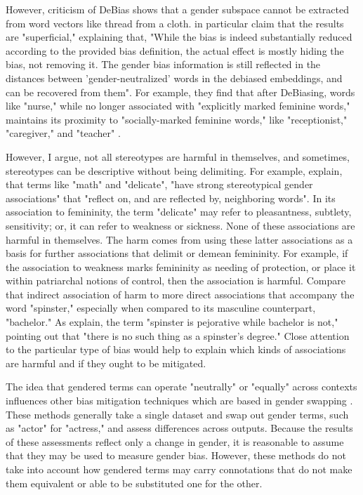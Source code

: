 \documentclass[11pt]{article}
\begin{document}
However, criticism of DeBias shows that a gender subspace cannot be extracted
from word vectors like thread from a cloth. \citet{gonen:2019} in
particular claim that the results are "superficial," explaining that,
"While the bias is indeed substantially reduced according to the
provided bias definition, the actual effect is mostly hiding the bias,
not removing it. The gender bias information is still reflected in the
distances between 'gender-neutralized' words in the debiased
embeddings, and can be recovered from them". For example, they find
that after DeBiasing, words like "nurse," while no longer associated
with "explicitly marked feminine words," maintains its proximity to
"socially-marked feminine words," like "receptionist," "caregiver,"
and "teacher" \citep{gonen:2019}.

However, I argue, not all
stereotypes are harmful in themselves, and sometimes, stereotypes can
be descriptive without being delimiting. For
example, \citet{gonen:2019} explain, that terms like "math" and
"delicate", "have strong stereotypical gender associations" that
"reflect on, and are reflected by, neighboring words". In its
association to femininity, the term "delicate" may refer to
pleasantness, subtlety, sensitivity; or, it can refer to weakness or
sickness. None of these associations are harmful in themselves. The
harm comes from using these latter associations as a basis for further
associations that delimit or demean femininity. For example, if the association
to weakness marks femininity as needing of protection, or place it
within patriarchal notions of control, then the association is
harmful. Compare that indirect association of harm to more direct associations that accompany the
word "spinster," especially when compared to its masculine counterpart, "bachelor." As \citet{devinney:2022} explain, the
term "spinster is pejorative while bachelor is not," pointing out that
"there is no such thing as a spinster’s degree." Close attention to
the particular type of bias would help to explain which kinds of
associations are harmful and if they ought to be mitigated.

The idea that gendered terms can operate "neutrally" or "equally"
across contexts influences other bias mitigation techniques which are
based in gender swapping \citep{zhao:2018}. These methods generally take a single dataset and swap out gender terms, such as "actor" for "actress," and assess differences across outputs.
Because the results of these assessments reflect only a change in gender, it is
reasonable to assume that they may be used to measure gender bias.
However, these methods do not take into account how gendered terms
may carry connotations that do not make them equivalent or able to be
substituted one for the other.
\end{document}
